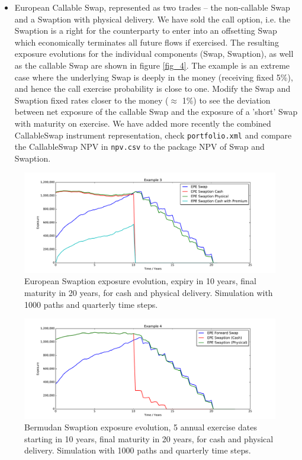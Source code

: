 \begin{itemize}
\item European Callable Swap, represented as two trades -- the non-callable Swap and a Swaption
  with physical delivery. We have sold the call option, i.e. the Swaption is a right for the counterparty to enter into
  an offsetting Swap which economically terminates all future flows if exercised. The resulting exposure evolutions
  for the individual components (Swap, Swaption), as well as the callable Swap are shown in figure \ref{fig_4}.
  The example is an extreme case where the underlying Swap is deeply in the money (receiving fixed 5\%), and hence the
  call exercise probability is close to one. Modify the Swap and Swaption fixed rates closer to the money ($\approx$ 1\%)
  to see the deviation between net exposure of the callable Swap and the exposure of a 'short' Swap with maturity on
  exercise. We have added more recently the combined CallableSwap instrument representation, check {\tt portfolio.xml}
  and compare the CallableSwap NPV in {\tt npv.csv} to the package NPV of Swap and Swaption.
\end{itemize}

\begin{figure}[htb]
\begin{center}
\includegraphics[scale=0.45]{examples/mpl_swaption.pdf}
\end{center}
\caption{European Swaption exposure evolution, expiry in 10 years, final maturity in 20 years, for cash and physical
  delivery. Simulation with 1000 paths and quarterly time steps. }
\label{fig_3}
\end{figure}

\begin{figure}[htb]
\begin{center}
\includegraphics[scale=0.45]{examples/mpl_bermudan_swaption.pdf}
\end{center}
\caption{Bermudan Swaption exposure evolution, 5 annual exercise dates starting in 10 years, final maturity in 20 years,
  for cash and physical delivery. Simulation with 1000 paths and quarterly time steps.}
\label{fig_3b}
\end{figure}

